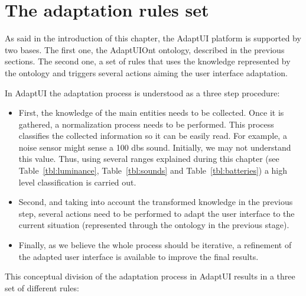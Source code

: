 \section{The adaptation rules set}
\label{sec:adaptui_rules}

As said in the introduction of this chapter, the AdaptUI platform is supported
by two bases. The first one, the AdaptUIOnt ontology, described in the previous
sections. The second one, a set of rules that uses the knowledge represented
by the ontology and triggers several actions aiming the user interface adaptation.


In AdaptUI the adaptation process is understood as a three step procedure: 

\begin{itemize}
 \item First, the knowledge of the main entities needs to be collected. Once it
 is gathered, a normalization process needs to be performed. This process classifies
 the collected information so it can be easily read. For example, a noise sensor
 might sense a 100 \acp{db} sound. Initially, we may not understand this value. Thus,
 using several ranges explained during this chapter (see Table~\ref{tbl:luminance},
 Table~\ref{tbl:sounds} and Table~\ref{tbl:batteries}) a high level classification
 is carried out.
 
 \item Second, and taking into account the transformed knowledge in the previous
 step, several actions need to be performed to adapt the user interface to the
 current situation (represented through the ontology in the previous stage).
 
 \item Finally, as we believe the whole process should be iterative, a refinement
 of the adapted user interface is available to improve the final results.
\end{itemize}

This conceptual division of the adaptation process in AdaptUI results in a three
set of different rules:

